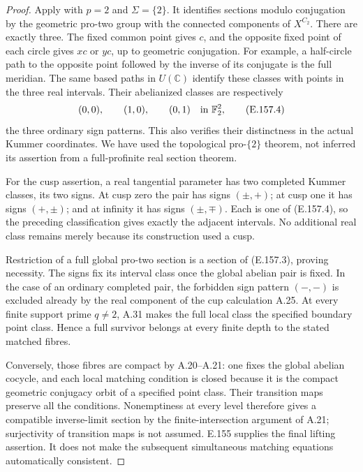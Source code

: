 \begin{proof}
Apply \citet[Theorem~2.4, author p.~5; Definition~2.3,
author pp.~4--5]{CohPal2011} with \(p=2\) and
\(\Sigma=\{2\}\). It identifies sections modulo conjugation
by the geometric pro-two group with the connected
components of \(X^{C_2}\). There are exactly three.
The fixed common point gives \(c\), and the opposite
fixed point of each circle gives \(xc\) or \(yc\), up
to geometric conjugation. For example, a half-circle
path to the opposite point followed by the inverse of
its conjugate is the full meridian.
The same based paths in \(U(\mathbb C)\) identify these
classes with points in the three real intervals. Their
abelianized classes are respectively
\[
                    (0,0),\qquad(1,0),\qquad(0,1)
                    \quad\hbox{in }\mathbb F_2^2,
 \tag{E.157.4}
\]
the three ordinary sign patterns. This also verifies
their distinctness in the actual Kummer coordinates.
We have used the topological pro-\(\{2\}\) theorem,
not inferred its assertion from a full-profinite real
section theorem.

For the cusp assertion, a real tangential parameter has
two completed Kummer classes, its two signs. At cusp
zero the pair has signs \((\pm,+)\); at cusp one it
has signs \((+,\pm)\); and at infinity it has signs
\((\pm,\mp)\). Each is one of (E.157.4), so the preceding
classification gives exactly the adjacent intervals.
No additional real class remains merely because its
construction used a cusp.

Restriction of a full global pro-two section is a section
of (E.157.3), proving necessity. The signs fix its interval
class once the global abelian pair is fixed. In the case
of an ordinary completed pair, the forbidden sign
pattern \((-,-)\) is excluded already by the real
component of the cup calculation A.25.
At every finite support prime \(q\ne2\), A.31 makes the
full local class the specified boundary point class.
Hence a full survivor belongs at every finite depth to
the stated matched fibres.

Conversely, those fibres are compact by A.20--A.21:
one fixes the global abelian cocycle, and each local
matching condition is closed because it is the compact
geometric conjugacy orbit of a specified point class.
Their transition maps preserve all the conditions.
Nonemptiness at every level therefore gives a compatible
inverse-limit section by the finite-intersection argument
of A.21; surjectivity of transition maps is not assumed.
E.155 supplies the final lifting assertion. It does not
make the subsequent simultaneous matching equations
automatically consistent.
\end{proof}
